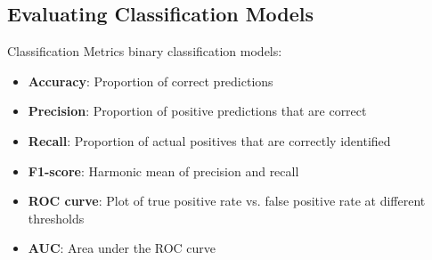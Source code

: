 \multend

\subsection{Evaluating Classification Models}


\begin{definition}{Classification Metrics}
binary classification models:
\begin{itemize}
    \item \textbf{Accuracy}: Proportion of correct predictions
    \item \textbf{Precision}: Proportion of positive predictions that are correct
    \item \textbf{Recall}: Proportion of actual positives that are correctly identified
    \item \textbf{F1-score}: Harmonic mean of precision and recall
    \item \textbf{ROC curve}: Plot of true positive rate vs. false positive rate at different thresholds
    \item \textbf{AUC}: Area under the ROC curve
\end{itemize}
\end{definition}




